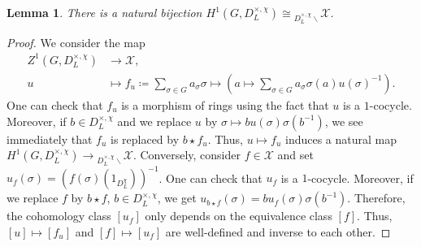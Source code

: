 \documentclass[a4paper,10pt]{amsart}
\theoremstyle{plain}
\newtheorem{lemma}[theorem]{Lemma}
\theoremstyle{definition}
\theoremstyle{remark}
\def\Xcal{\mathcal{X}}
\newcommand{\bD}{D_L}
\begin{document}
\begin{lemma}\label{lemma: skew reps and H1}
There is a natural bijection \(H^1(G, \bD^{\times, \chi}) \cong {}_{\bD^{\times, \chi} \backslash} \Xcal\).
\end{lemma}
\begin{proof}
We consider the map
\begin{align*}
    Z^1(G, \bD^{\times, \chi}) & \longrightarrow \Xcal,\\
    u & \longmapsto f_u \coloneqq \sum_{\sigma \in G} a_\sigma \sigma \longmapsto \left( a \mapsto \sum_{\sigma \in G} a_\sigma \sigma(a) u(\sigma)^{-1}\right).
\end{align*}
One can check that \(f_u\) is a morphism of rings using the fact that \(u\) is a \(1\)-cocycle. 
Moreover, if \(b \in \bD^{\times, \chi}\) and we replace \(u\) by \(\sigma \mapsto bu(\sigma)\sigma(b^{-1})\), we see immediately that \(f_u\) is replaced by \(b \star f_u\). Thus, \(u \mapsto f_u\) induces a natural map \(H^1(G, \bD^{\times, \chi}) \to {}_{\bD^{\times, \chi} \backslash} \Xcal\). Conversely, consider \(f \in \Xcal\) and set \(u_f(\sigma) = (f(\sigma)(1_{\bD^\chi}))^{-1}\). 
One can check that \(u_f\) is a \(1\)-cocycle. Moreover, if we replace \(f\) by \(b\star f\), \(b \in \bD^{\times, \chi}\), we get \(u_{b \star f}(\sigma) = bu_f(\sigma)\sigma(b^{-1})\).
Therefore, the cohomology class \([u_f]\) only depends on the equivalence class \([f]\).
Thus, \([u] \mapsto [f_u]\) and \([f] \mapsto [u_f]\) are well-defined and inverse to each other.  
\end{proof}
\end{document}
